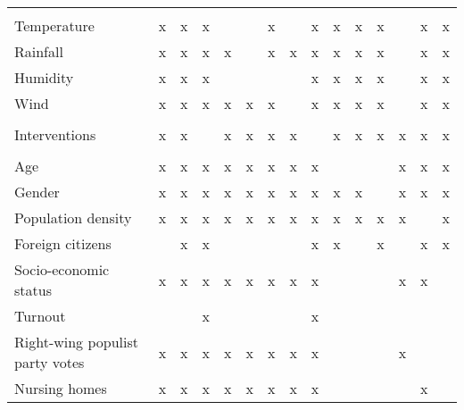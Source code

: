 \documentclass[10pt,letterpaper]{article}
\begin{document}
\begin{table}[!ht]
\begin{adjustwidth}{-2.25in}{0in}
\begin{tabular}[t]{lllllllllllllll}
\addlinespace[0.3em]
\multicolumn{15}{l}{\textbf{Weather}}\\
\hspace{1em}Temperature & x & x & x &  &  & x &  & x & x & x & x &  & x & x\\
\hspace{1em}Rainfall & x & x & x & x &  & x & x & x & x & x & x &  & x & x\\
\hspace{1em}Humidity & x & x & x &  &  &  &  & x & x & x & x &  & x & x\\
\hspace{1em}Wind & x & x & x & x & x & x &  & x & x & x & x &  & x & x\\
\addlinespace[0.3em]
\multicolumn{15}{l}{\textbf{Interventions}}\\
\hspace{1em}Interventions & x & x &  & x & x & x & x &  & x & x & x & x & x & x\\
\addlinespace[0.3em]
\multicolumn{15}{l}{\textbf{Socio-demographic}}\\
\hspace{1em}Age & x & x & x & x & x & x & x & x &  &  &  & x & x & x\\
\hspace{1em}Gender & x & x & x & x & x & x & x & x & x & x &  & x & x & x\\
\hspace{1em}Population density & x & x & x & x & x & x & x & x & x & x & x & x &  & x\\
\hspace{1em}Foreign citizens &  & x & x &  &  &  &  & x & x &  & x &  & x & x\\
\hspace{1em}Socio-economic status & x & x & x & x & x & x & x & x &  &  &  & x & x & \\
\hspace{1em}Turnout &  &  & x &  &  &  &  & x &  &  &  &  &  & \\
\hspace{1em}Right-wing populist party votes & x & x & x & x & x & x & x & x &  &  &  & x &  & \\
\hspace{1em}Nursing homes & x & x & x & x & x & x & x & x &  &  &  &  & x & \\
\bottomrule
\end{tabular}
\label{tab:adjsets}
\end{adjustwidth}
\end{table}
\end{document}
